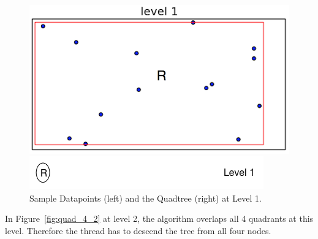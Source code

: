 \begin{figure}[H]
  \centering
  \vspace{0.5in}
  \begin{minipage}[b]{0.35\textwidth}
    \includegraphics[width=\textwidth]{Images/4Quad1_1}
  \end{minipage}
  \hfill
  \begin{minipage}[b]{0.6\textwidth}
    \includegraphics[width=\textwidth]{Images/1_1Quad_1_tree}
  \end{minipage}
  \vspace{0.5in}
  \caption{Sample Datapoints (left) and the Quadtree (right) at Level 1.}
  \label{fig:quad_4_1}
\end{figure}

In Figure~\ref{fig:quad_4_2} 
at level 2, the algorithm  overlaps all 4 quadrants at this level. Therefore the thread has to descend the tree from all four nodes.

